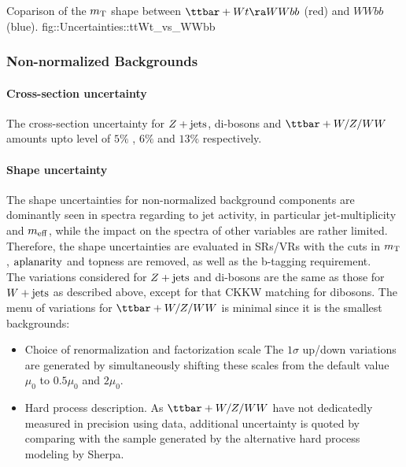 {Coparison of the $m_{\mathrm{T}}$ shape between $\ttbar+Wt \ra WWbb$ (red) and $WWbb$ (blue).}
{fig::Uncertainties::ttWt_vs_WWbb}





\clearpage
\subsubsection{Non-normalized Backgrounds}  
\paragraph{Cross-section uncertainty}
The cross-section uncertainty for $Z+\mathrm{jets}$, di-bosons and $\ttbar+W/Z/WW$ amounts upto level of $5\%$ \cite{VjetsXsecMeas_ATLAS_Run1}, $6\%$ \cite{BosonXsec_calc_ATLAS} and $13\%$ \cite{Alwall:2014hca} respectively. 

\paragraph{Shape uncertainty}
The shape uncertainties for non-normalized background components are dominantly seen in spectra regarding to jet activity, in particular jet-multiplicity and $m_{\mathrm{eff}}$, while the impact on the spectra of other variables are rather limited. Therefore, the shape uncertainties are evaluated in SRs/VRs with the cuts in $m_{\mathrm{T}}$, $\mathrm{aplanarity}$ and topness are removed, as well as the b-tagging requirement. \\


The variations considered for $Z+\mathrm{jets}$ and di-bosons are the same as those for $W+\mathrm{jets}$ as described above, except for that CKKW matching for dibosons. The menu of variations for $\ttbar+W/Z/WW$ is minimal since it is the smallest backgrounds:
\begin{itemize}
\item Choice of renormalization and factorization scale
The $1\sigma$ up/down variations are generated by simultaneously shifting these scales from the default value $\mu_0$ to $0.5\mu_0$ and $2\mu_0$.
\item Hard process description.
As $\ttbar+W/Z/WW$ have not dedicatedly measured in precision using data, additional uncertainty is quoted by comparing with the sample generated by the alternative hard process modeling by Sherpa.
\end{itemize}

